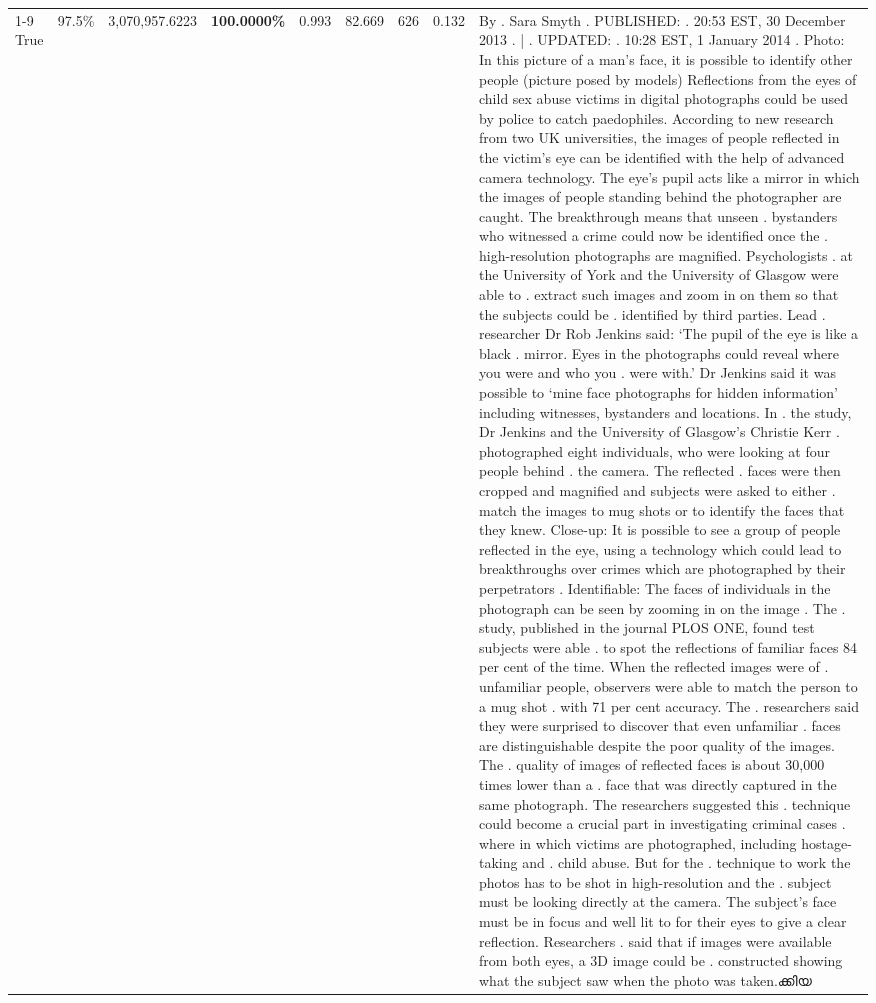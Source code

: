 \begin{table}[H]
\begin{tabular}{lllrlllll}
\cline{1-9} \cline{2-9}
True & 97.5\% & 3,070,957.6223 & \bfseries \color{red} 100.0000\% & 0.993 & 82.669 & 626 & 0.132 & By . Sara Smyth . PUBLISHED: . 20:53 EST, 30 December 2013 . | . UPDATED: . 10:28 EST, 1 January 2014 . Photo: In this picture of a man's face, it is possible to identify other people (picture posed by models) Reflections from the eyes of child sex abuse victims in digital photographs could be used by police to catch paedophiles. According to new research from two UK universities, the images of people reflected in the victim's eye can be identified with the help of advanced camera technology. The eye's pupil acts like a mirror in which the images of people standing behind the photographer are caught. The breakthrough means that unseen . bystanders who witnessed a crime could now be identified once the . high-resolution photographs are magnified. Psychologists . at the University of York and the University of Glasgow were able to . extract such images and zoom in on them so that the subjects could be . identified by third parties. Lead . researcher Dr Rob Jenkins said: ‘The pupil of the eye is like a black . mirror. Eyes in the photographs could reveal where you were and who you . were with.' Dr Jenkins said it was possible to ‘mine face photographs for hidden information' including witnesses, bystanders and locations. In . the study, Dr Jenkins and the University of Glasgow's Christie Kerr . photographed eight individuals, who were looking at four people behind . the camera. The reflected . faces were then cropped and magnified and subjects were asked to either . match the images to mug shots or to identify the faces that they knew. Close-up: It is possible to see a group of people reflected in the eye, using a technology which could lead to breakthroughs over crimes which are photographed by their perpetrators . Identifiable: The faces of individuals in the photograph can be seen by zooming in on the image . The . study, published in the journal PLOS ONE, found test subjects were able . to spot the reflections of familiar faces 84 per cent of the time. When the reflected images were of . unfamiliar people, observers were able to match the person to a mug shot . with 71 per cent accuracy. The . researchers said they were surprised to discover that even unfamiliar . faces are distinguishable despite the poor quality of the images. The . quality of images of reflected faces is about 30,000 times lower than a . face that was directly captured in the same photograph. The researchers suggested this . technique could become a crucial part in investigating criminal cases . where in which victims are photographed, including hostage-taking and . child abuse. But for the . technique to work the photos has to be shot in high-resolution and the . subject must be looking directly at the camera. The subject's face must be in focus and well lit to for their eyes to give a clear reflection. Researchers . said that if images were available from both eyes, a 3D image could be . constructed showing what the subject saw when the photo was taken.ക്കിയ \\

\end{tabular}
\end{table}

